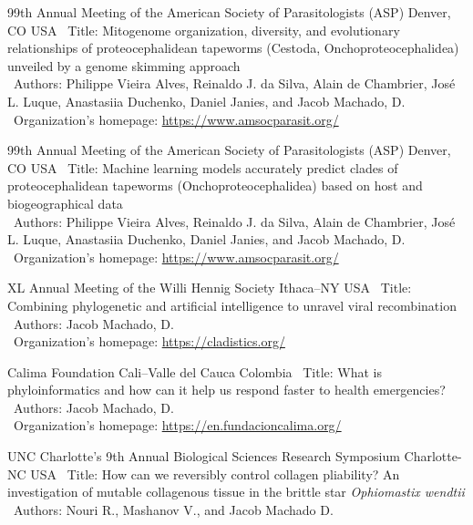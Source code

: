\documentclass[11pt, letterpaper, sans]{moderncv}
\begin{document}
    {99th Annual Meeting of the American Society of Parasitologists (ASP)}
    {Denver, CO}
    {USA}
    {}
    {
        \textbullet~Title: Mitogenome organization, diversity, and evolutionary relationships of proteocephalidean tapeworms (Cestoda, Onchoproteocephalidea) unveiled by a genome skimming approach\\
        \textbullet~Authors: Philippe Vieira Alves, Reinaldo J. da Silva, Alain de Chambrier, José L. Luque, Anastasiia Duchenko, Daniel Janies, and Jacob Machado, D.\\
        \textbullet~Organization's homepage: \url{https://www.amsocparasit.org/}
    }

    {99th Annual Meeting of the American Society of Parasitologists (ASP)}
    {Denver, CO}
    {USA}
    {}
    {
        \textbullet~Title: Machine learning models accurately predict clades of proteocephalidean tapeworms (Onchoproteocephalidea) based on host and biogeographical data\\
        \textbullet~Authors: Philippe Vieira Alves, Reinaldo J. da Silva, Alain de Chambrier, José L. Luque, Anastasiia Duchenko, Daniel Janies, and Jacob Machado, D.\\
        \textbullet~Organization's homepage: \url{https://www.amsocparasit.org/}
    }

	{XL Annual Meeting of the Willi Hennig Society}
	{Ithaca--NY}
	{USA}
	{}
	{
		\textbullet~Title: Combining phylogenetic and artificial intelligence to unravel viral recombination\\
		\textbullet~Authors: Jacob Machado, D.\\
		\textbullet~Organization's homepage: \url{https://cladistics.org/}
	}
	
\cventry{---}
	{Calima Foundation}
	{Cali--Valle del Cauca}
	{Colombia}
	{}
	{
		\textbullet~Title: What is phyloinformatics and how can it help us respond faster to health emergencies?\\
		\textbullet~Authors: Jacob Machado, D.\\
		\textbullet~Organization's homepage: \url{https://en.fundacioncalima.org/}
	}

\cventry{---}
	{UNC Charlotte’s 9th Annual Biological Sciences Research Symposium}
	{Charlotte-NC}
	{USA}
	{}
	{
		\textbullet~Title: How can we reversibly control collagen pliability? An investigation of mutable collagenous tissue in the brittle star \textit{Ophiomastix wendtii}\\
		\textbullet~Authors: Nouri R., Mashanov V., and Jacob Machado D.\\
	}
\end{document}
